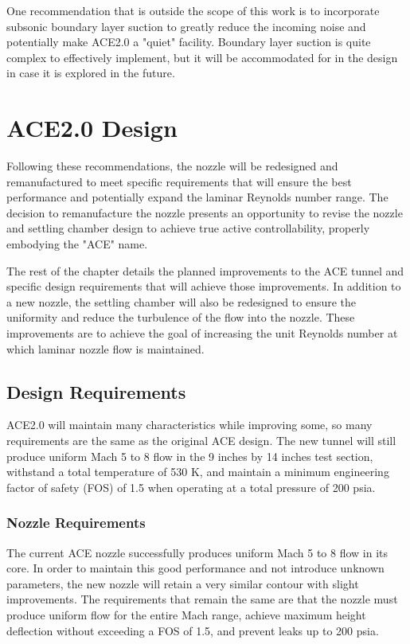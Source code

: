 One recommendation that is outside the scope of this work is to incorporate subsonic boundary layer suction to greatly reduce the incoming noise and potentially make ACE2.0 a "quiet" facility. Boundary layer suction is quite complex to effectively implement, but it will be accommodated for in the design in case it is explored in the future. 

\section{ACE2.0 Design}

Following these recommendations, the nozzle will be redesigned and remanufactured to meet specific requirements that will ensure the best performance and potentially expand the laminar Reynolds number range. The decision to remanufacture the nozzle presents an opportunity to revise the nozzle and settling chamber design to achieve true active controllability, properly embodying the "ACE" name.

The rest of the chapter details the planned improvements to the ACE tunnel and specific design requirements that will achieve those improvements. In addition to a new nozzle, the settling chamber will also be redesigned to ensure the uniformity and reduce the turbulence of the flow into the nozzle. These improvements are to achieve the goal of increasing the unit Reynolds number at which laminar nozzle flow is maintained.

\subsection{Design Requirements}

ACE2.0 will maintain many characteristics while improving some, so many requirements are the same as the original ACE design. The new tunnel will still produce uniform Mach 5 to 8 flow in the 9 inches by 14 inches test section, withstand a total temperature of 530 K, and maintain a minimum engineering factor of safety (FOS) of 1.5 when operating at a total pressure of 200 psia.

\subsubsection*{Nozzle Requirements}

The current ACE nozzle successfully produces uniform Mach 5 to 8 flow in its core. In order to maintain this good performance and not introduce unknown parameters, the new nozzle will retain a very similar contour with slight improvements. The requirements that remain the same are that the nozzle must produce uniform flow for the entire Mach range, achieve maximum height deflection without exceeding a FOS of 1.5, and prevent leaks up to 200 psia.


